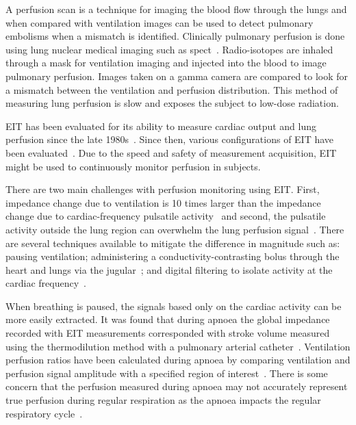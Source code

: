 A perfusion scan is a technique for imaging the blood flow through the lungs
and when compared with ventilation images can be used to detect pulmonary embolisms
when a mismatch is identified. Clinically pulmonary perfusion is done using 
lung nuclear medical imaging such as \acrfull{spect}~\parencite{Parker2012}. Radio-isotopes are inhaled through a mask 
for ventilation imaging and injected into the blood to image pulmonary perfusion. 
Images taken on a gamma camera are compared to look for a mismatch between the ventilation
and perfusion distribution. This method of 
measuring lung perfusion is slow and exposes the subject to low-dose radiation.

EIT has been evaluated for its ability to measure cardiac output and
lung perfusion since the late 1980s~\parencite{Eyuboglu1989,Blottt1992,Brown1992,Frerichs2002}. 
Since then, various configurations of EIT have been evaluated~\parencite{Borges2012,Nguyen2015}.
Due to the speed and safety of measurement acquisition, EIT might be used to continuously monitor 
perfusion in subjects.

There are two main challenges with perfusion monitoring using EIT. First, impedance change due to ventilation 
is 10 times larger than the impedance change due to cardiac-frequency pulsatile activity~\parencite{Deibele2008}
and second, the pulsatile activity outside the lung region can overwhelm the lung perfusion signal~\parencite{Stowe2019}. 
There are several techniques available to mitigate the difference 
in magnitude such as: pausing ventilation; administering a 
conductivity-contrasting bolus through the heart and lungs via the jugular~\parencite{Frerichs2002};
and digital filtering to isolate activity at the cardiac frequency~\parencite{Leathard1994}. 

When breathing is paused, the signals based only on the cardiac activity can be more easily extracted. 
It was found that during apnoea the global impedance recorded with EIT measurements corresponded with stroke volume 
measured using the 
thermodilution method with a pulmonary arterial catheter~\parencite{Fagerberg2009}.
Ventilation perfusion ratios have been calculated during apnoea by comparing 
ventilation and perfusion signal amplitude with a specified region of 
interest~\parencite{Fagerberg2009a}.
There is some concern that the perfusion measured during apnoea may not accurately represent 
true perfusion during regular respiration as the apnoea impacts the regular respiratory cycle~\parencite{Leonhardt2012}.

